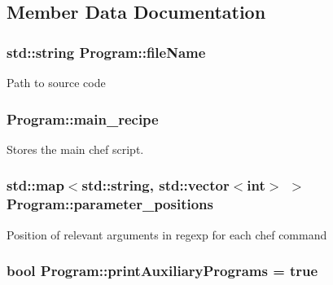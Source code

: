 \subsection{Member Data Documentation}
\hypertarget{classProgram_ad0706a337cb07f091661cc438e815758}{
\subsubsection[{file\-Name}]{\setlength{\rightskip}{0pt plus 5cm}std\-::string Program\-::file\-Name\hspace{0.3cm}{\ttfamily [private]}}}\label{classProgram_ad0706a337cb07f091661cc438e815758}
Path to source code \hypertarget{classProgram_a414bb40153c7da0e1815b7140c4aa454}{
\subsubsection[{main\-\_\-recipe}]{ Program\-::main\-\_\-recipe\hspace{0.3cm}{\ttfamily [private]}}}\label{classProgram_a414bb40153c7da0e1815b7140c4aa454}
Stores the main chef script. \hypertarget{classProgram_a7c928870bbd95e8612e9f8efaf7d263b}{
\subsubsection[{parameter\-\_\-positions}]{\setlength{\rightskip}{0pt plus 5cm}std\-::map$<$std\-::string, std\-::vector$<$int$>$ $>$ Program\-::parameter\-\_\-positions\hspace{0.3cm}{\ttfamily [private]}}}\label{classProgram_a7c928870bbd95e8612e9f8efaf7d263b}
Position of relevant arguments in regexp for each chef command \hypertarget{classProgram_ad4371cad6bc5c0f4cd232007a2324205}{
\subsubsection[{print\-Auxiliary\-Programs}]{\setlength{\rightskip}{0pt plus 5cm}bool Program\-::print\-Auxiliary\-Programs = true\hspace{0.3cm}{\ttfamily [private]}}}\label{classProgram_ad4371cad6bc5c0f4cd232007a2324205}
